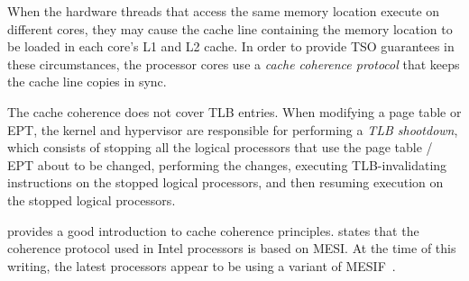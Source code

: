 When the hardware threads that access the same memory location execute on
different cores, they may cause the cache line containing the memory location
to be loaded in each core's L1 and L2 cache. In order to provide TSO guarantees
in these circumstances, the processor cores use a \textit{cache coherence
protocol} that keeps the cache line copies in sync.


The cache coherence does not cover TLB entries. When modifying a page table
or EPT, the kernel and hypervisor are responsible for performing a
\textit{TLB shootdown}, which consists of stopping all the logical processors
that use the page table / EPT about to be changed, performing the changes,
executing TLB-invalidating instructions on the stopped logical processors, and
then resuming execution on the stopped logical processors.

\cite{hennessy2012architecture} provides a good introduction to cache coherence
principles. \cite{intel2014manual} states that the coherence protocol used in
Intel processors is based on MESI. At the time of this writing, the latest
processors appear to be using a variant of
MESIF~\cite{goodman2009mesif, ziakas2010qpi}.
